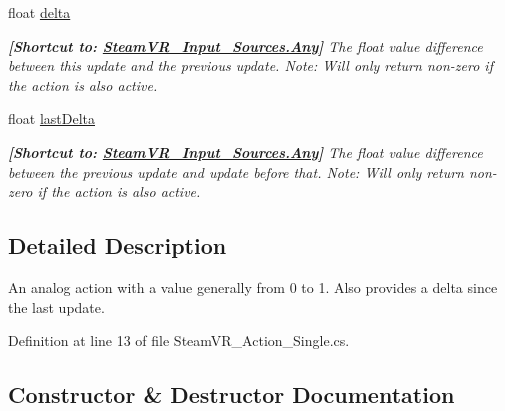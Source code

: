 \begin{DoxyCompactItemize}
float \mbox{\hyperlink{class_valve_1_1_v_r_1_1_steam_v_r___action___single_ab851061c00607a9fabe39db21cd00ac0}{delta}}
\begin{DoxyCompactList}\small\item\em {\bfseries{\mbox{[}Shortcut to\+: \mbox{\hyperlink{namespace_valve_1_1_v_r_a82e5bf501cc3aa155444ee3f0662853faed36a1ef76a59ee3f15180e0441188ad}{Steam\+V\+R\+\_\+\+Input\+\_\+\+Sources.\+Any}}\mbox{]}}} The float value difference between this update and the previous update. Note\+: Will only return non-\/zero if the action is also active. \end{DoxyCompactList}\item 
float \mbox{\hyperlink{class_valve_1_1_v_r_1_1_steam_v_r___action___single_a7debc59f65b7f98973df24c8de93ed6c}{last\+Delta}}
\begin{DoxyCompactList}\small\item\em {\bfseries{\mbox{[}Shortcut to\+: \mbox{\hyperlink{namespace_valve_1_1_v_r_a82e5bf501cc3aa155444ee3f0662853faed36a1ef76a59ee3f15180e0441188ad}{Steam\+V\+R\+\_\+\+Input\+\_\+\+Sources.\+Any}}\mbox{]}}} The float value difference between the previous update and update before that. Note\+: Will only return non-\/zero if the action is also active. \end{DoxyCompactList}\end{DoxyCompactItemize}


\subsection{Detailed Description}
An analog action with a value generally from 0 to 1. Also provides a delta since the last update. 



Definition at line 13 of file Steam\+V\+R\+\_\+\+Action\+\_\+\+Single.\+cs.



\subsection{Constructor \& Destructor Documentation}
\mbox{\label{class_valve_1_1_v_r_1_1_steam_v_r___action___single_a2d51af077b79d68b587a6e13f3d57cac}} 
